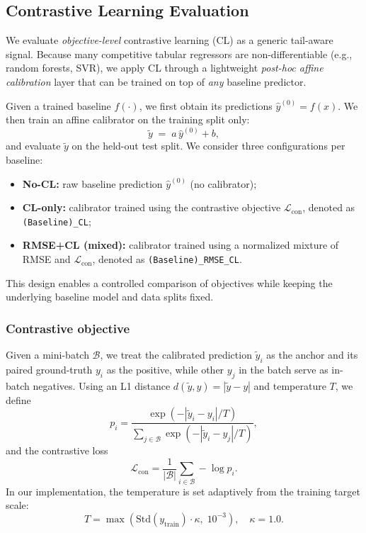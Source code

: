 \documentclass[preprint,12pt]{elsarticle}
\begin{document}
\subsection{Contrastive Learning Evaluation}
\label{sec:contrastive}
We evaluate \emph{objective-level} contrastive learning (CL) as a generic tail-aware signal. Because many competitive tabular regressors are non-differentiable (e.g., random forests, SVR), we apply CL through a lightweight \emph{post-hoc affine calibration} layer that can be trained on top of \emph{any} baseline predictor.

Given a trained baseline $f(\cdot)$, we first obtain its predictions $\hat{y}^{(0)}=f(x)$. We then train an affine calibrator on the training split only:
\begin{equation}
\tilde{y} \;=\; a\,\hat{y}^{(0)} + b,
\end{equation}
and evaluate $\tilde{y}$ on the held-out test split. We consider three configurations per baseline:
\begin{itemize}
    \item \textbf{No-CL:} raw baseline prediction $\hat{y}^{(0)}$ (no calibrator);
    \item \textbf{CL-only:} calibrator trained using the contrastive objective $\mathcal{L}_{\mathrm{con}}$, denoted as \texttt{(Baseline)\_CL};
    \item \textbf{RMSE+CL (mixed):} calibrator trained using a normalized mixture of RMSE and $\mathcal{L}_{\mathrm{con}}$, denoted as \texttt{(Baseline)\_RMSE\_CL}.
\end{itemize}
This design enables a controlled comparison of objectives while keeping the underlying baseline model and data splits fixed.

\subsubsection{Contrastive objective}
Given a mini-batch $\mathcal{B}$, we treat the calibrated prediction $\tilde{y}_i$ as the anchor and its paired ground-truth $y_i$ as the positive, while other $y_j$ in the batch serve as in-batch negatives. Using an L1 distance $d(\tilde{y},y)=|\tilde{y}-y|$ and temperature $T$, we define
\begin{equation}
p_i=
\frac{\exp\!\left(-|\tilde{y}_i-y_i|/T\right)}
{\sum_{j\in\mathcal{B}}\exp\!\left(-|\tilde{y}_i-y_j|/T\right)},
\end{equation}
and the contrastive loss
\begin{equation}
\mathcal{L}_{\mathrm{con}}=\frac{1}{|\mathcal{B}|}\sum_{i\in\mathcal{B}}-\log p_i.
\end{equation}
In our implementation, the temperature is set adaptively from the training target scale:
\begin{equation}
T=\max\!\left(\mathrm{Std}(y_{\mathrm{train}})\cdot \kappa,\;10^{-3}\right),\quad \kappa=1.0.
\end{equation}
\end{document}

